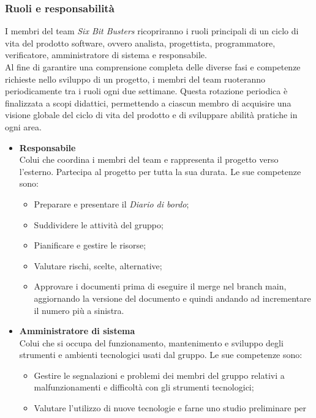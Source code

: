 \subsubsection{Ruoli e responsabilità}
I membri del team \textit{Six Bit Busters} ricopriranno i ruoli principali di un
ciclo di vita del prodotto software, ovvero analista, progettista,
programmatore, verificatore, amministratore di sistema e responsabile. \\ Al
fine di garantire una comprensione completa delle diverse fasi e competenze
richieste nello sviluppo di un progetto, i membri del team ruoteranno
periodicamente tra i ruoli ogni due settimane. Questa rotazione periodica è
finalizzata a scopi didattici, permettendo a ciascun membro di acquisire una
visione globale del ciclo di vita del prodotto e di sviluppare abilità pratiche
in ogni area.
\begin{itemize}
    \item \textbf{Responsabile}\\
          Colui che coordina i membri del team e rappresenta il progetto verso l'esterno.
          Partecipa al progetto per tutta la sua durata.
          Le sue competenze sono:
          \begin{itemize}
              \item Preparare e presentare il \textit{Diario di bordo};
              \item Suddividere le attività del gruppo;
              \item Pianificare e gestire le risorse;
              \item Valutare rischi, scelte, alternative;
              \item Approvare i documenti prima di eseguire il merge nel branch main, aggiornando
                    la versione del documento e quindi andando ad incrementare il numero più a
                    sinistra.
          \end{itemize}
    \item \textbf{Amministratore di sistema}\\
          Colui che si occupa del funzionamento, mantenimento e sviluppo degli strumenti e ambienti tecnologici
          usati dal gruppo.
          Le sue competenze sono:
          \begin{itemize}
              \item Gestire le segnalazioni e problemi dei membri del gruppo relativi a
                    malfunzionamenti e difficoltà con gli strumenti tecnologici;
              \item Valutare l'utilizzo di nuove tecnologie e farne uno studio preliminare per

\end{itemize}
\end{itemize}
